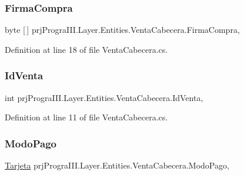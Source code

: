 \subsubsection{\texorpdfstring{Firma\+Compra}{FirmaCompra}}
{\footnotesize\ttfamily byte \mbox{[}$\,$\mbox{]} prj\+Progra\+I\+I\+I.\+Layer.\+Entities.\+Venta\+Cabecera.\+Firma\+Compra\hspace{0.3cm}{\ttfamily [get]}, {\ttfamily [set]}}



Definition at line 18 of file Venta\+Cabecera.\+cs.

\hypertarget{classprj_progra_i_i_i_1_1_layer_1_1_entities_1_1_venta_cabecera_aa824c5bc8ec364abf408a8dd33021555}{}\label{classprj_progra_i_i_i_1_1_layer_1_1_entities_1_1_venta_cabecera_aa824c5bc8ec364abf408a8dd33021555} 
\subsubsection{\texorpdfstring{Id\+Venta}{IdVenta}}
{\footnotesize\ttfamily int prj\+Progra\+I\+I\+I.\+Layer.\+Entities.\+Venta\+Cabecera.\+Id\+Venta\hspace{0.3cm}{\ttfamily [get]}, {\ttfamily [set]}}



Definition at line 11 of file Venta\+Cabecera.\+cs.

\hypertarget{classprj_progra_i_i_i_1_1_layer_1_1_entities_1_1_venta_cabecera_a0fdbc154d107d59d9308c145afe87123}{}\label{classprj_progra_i_i_i_1_1_layer_1_1_entities_1_1_venta_cabecera_a0fdbc154d107d59d9308c145afe87123} 
\subsubsection{\texorpdfstring{Modo\+Pago}{ModoPago}}
{\footnotesize\ttfamily \hyperlink{classprj_progra_i_i_i_1_1_layer_1_1_entities_1_1_tarjeta}{Tarjeta} prj\+Progra\+I\+I\+I.\+Layer.\+Entities.\+Venta\+Cabecera.\+Modo\+Pago\hspace{0.3cm}{\ttfamily [get]}, {\ttfamily [set]}}



